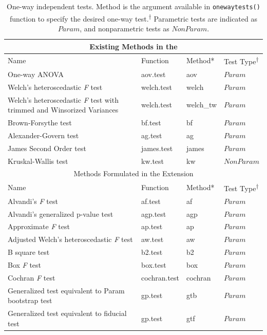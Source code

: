 \begin{table}[H]
\centering
\caption{One-way independent tests. Method is the argument available in \texttt{onewaytests()} function to specify the desired one-way test.\textsuperscript{$\dagger$} Parametric tests are indicated as \textbf{$Param$}, and nonparametric tests as \textbf{$NonParam$}.}
\begin{tabular}{llll}
\toprule
\multicolumn{4}{c}{Existing Methods in the \cite{dag2018onewaytests}} \\
\midrule
Name & Function & Method* & Test Type\textsuperscript{$\dagger$} \\ \hline
One-way ANOVA & aov.test  & aov       & \textbf{$Param$} \\
Welch's heteroscedastic \textit{F} test  & welch.test  & welch  & \textbf{$Param$} \\
Welch's heteroscedastic \textit{F} test with trimmed and Winsorized Variances & welch.test  & welch\_tw & \textbf{$Param$} \\
Brown-Forsythe test & bf.test & bf & \textbf{$Param$} \\
Alexander-Govern test  & ag.test  & ag & \textbf{$Param$} \\
James Second Order test  & james.test   & james & \textbf{$Param$} \\
Kruskal-Wallis test  & kw.test   & kw & \textbf{$NonParam$} \\
\toprule
\multicolumn{4}{c}{Methods Formulated in the Extension} \\
\midrule
Name & Function & Method* & Test Type\textsuperscript{$\dagger$} \\ \hline
Alvandi's \textit{F} test & af.test & af & \textbf{$Param$} \\
Alvandi’s generalized p-value test  & agp.test & agp & \textbf{$Param$} \\
Approximate \textit{F} test  & ap.test   & ap & \textbf{$Param$} \\
Adjusted Welch's heteroscedastic \textit{F} test & aw.test   & aw & \textbf{$Param$} \\
B square test  & b2.test   & b2 & \textbf{$Param$} \\
Box \textit{F} test  & box.test   & box & \textbf{$Param$} \\
Cochran \textit{F} test   & cochran.test  & cochran & \textbf{$Param$} \\
Generalized test equivalent to Param bootstrap test & gp.test  & gtb & \textbf{$Param$} \\
Generalized test equivalent to fiducial test  & gp.test   & gtf & \textbf{$Param$} \\

\end{tabular}
\end{table}
